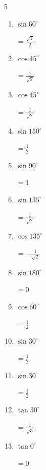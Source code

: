 \begin{multicols}{5}
\begin{enumerate}
        $\displaystyle =-\sqrt{3}$

  \item $\displaystyle \sin{60^\circ}$

        $\displaystyle =\frac{\sqrt{3}}{2}$

  \item $\displaystyle \cos{45^\circ}$

        $\displaystyle =\frac{1}{\sqrt{2}}$

  \item $\displaystyle \cos{45^\circ}$

        $\displaystyle =\frac{1}{\sqrt{2}}$

  \item $\displaystyle \sin{150^\circ}$

        $\displaystyle =\frac{1}{2}$

  \item $\displaystyle \sin{90^\circ}$

        $\displaystyle =1$

  \item $\displaystyle \sin{135^\circ}$

        $\displaystyle =\frac{1}{\sqrt{2}}$

  \item $\displaystyle \cos{135^\circ}$

        $\displaystyle =-\frac{1}{\sqrt{2}}$

  \item $\displaystyle \sin{180^\circ}$

        $\displaystyle =0$

  \item $\displaystyle \cos{60^\circ}$

        $\displaystyle =\frac{1}{2}$

  \item $\displaystyle \sin{30^\circ}$

        $\displaystyle =\frac{1}{2}$

  \item $\displaystyle \sin{30^\circ}$

        $\displaystyle =\frac{1}{2}$

  \item $\displaystyle \tan{30^\circ}$

        $\displaystyle =\frac{1}{\sqrt{3}}$

  \item $\displaystyle \tan{0^\circ}$

        $\displaystyle =0$


\end{enumerate}
\end{multicols}
